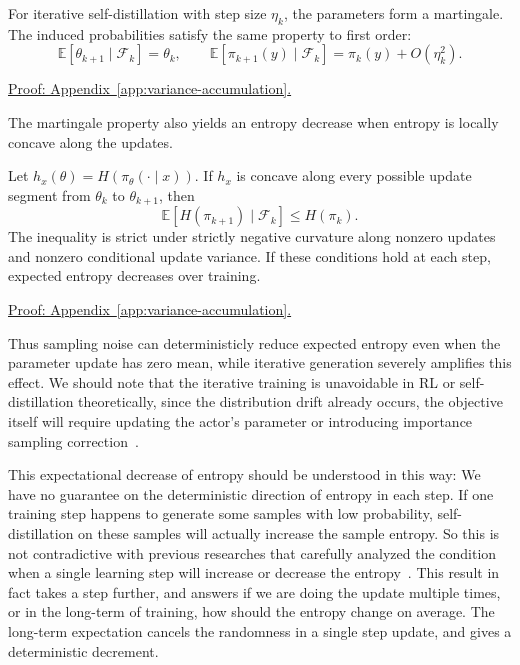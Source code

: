\begin{lemma}
\label{lem:self-distillation-martingale}
For iterative self-distillation with step size $\eta_k$, the parameters form a martingale. The induced probabilities satisfy the same property to first order:
\begin{equation}
 \mathbb E[\theta_{k+1}\mid\mathcal F_k]=\theta_k,
 \qquad
 \mathbb E[\pi_{k+1}(y)\mid\mathcal F_k]
 =\pi_k(y)+O(\eta_k^2).
 \label{eq:self-distillation-martingale}
\end{equation}
\end{lemma}
\noindent\hyperref[app:variance-accumulation]{Proof: Appendix~\ref*{app:variance-accumulation}.}

The martingale property also yields an entropy decrease when entropy is locally concave along the updates.

\begin{theorem}
\label{lem:self-distillation-entropy}
Let $h_x(\theta)=H(\pi_\theta(\cdot\mid x))$. If $h_x$ is concave along every possible update segment from $\theta_k$ to $\theta_{k+1}$, then
\begin{equation}
 \mathbb E[H(\pi_{k+1})\mid\mathcal F_k]\le H(\pi_k).
 \label{eq:self-distillation-entropy}
\end{equation}
The inequality is strict under strictly negative curvature along nonzero updates and nonzero conditional update variance. If these conditions hold at each step, expected entropy decreases over training.
\end{theorem}
\noindent\hyperref[app:variance-accumulation]{Proof: Appendix~\ref*{app:variance-accumulation}.}

Thus sampling noise can deterministicly reduce expected entropy even when the parameter update has zero mean, while iterative generation severely amplifies this effect. We should note that the iterative training is unavoidable in RL or self-distillation theoretically, since the distribution drift already occurs, the objective itself will require updating the actor's parameter or introducing importance sampling correction~\citep{schulman_proximal_2017}.

This expectational decrease of entropy should be understood in this way: We have no guarantee on the deterministic direction of entropy in each step. If one training step happens to generate some samples with low probability, self-distillation on these samples will actually increase the sample entropy. So this is not contradictive with previous researches that carefully analyzed the condition when a single learning step will increase or decrease the entropy~\citep{cui_entropy_2025, ren_learning_2025, jin_revisiting_2026, wang_entropy_2026}. This result in fact takes a step further, and answers if we are doing the update multiple times, or in the long-term of training, how should the entropy change on average. The long-term expectation cancels the randomness in a single step update, and gives a deterministic decrement.

